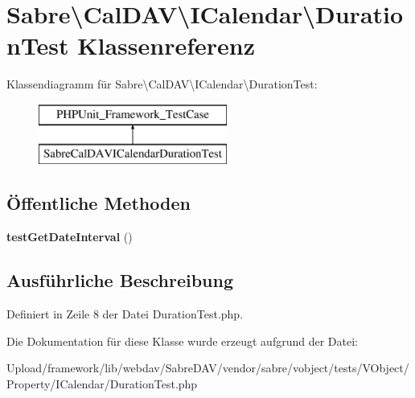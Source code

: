 \hypertarget{class_sabre_1_1_v_object_1_1_property_1_1_i_calendar_1_1_duration_test}{}\section{Sabre\textbackslash{}Cal\+D\+AV\textbackslash{}I\+Calendar\textbackslash{}Duration\+Test Klassenreferenz}
\label{class_sabre_1_1_v_object_1_1_property_1_1_i_calendar_1_1_duration_test}
Klassendiagramm für Sabre\textbackslash{}Cal\+D\+AV\textbackslash{}I\+Calendar\textbackslash{}Duration\+Test\+:\begin{figure}[H]
\begin{center}
\leavevmode
\includegraphics[height=2.000000cm]{class_sabre_1_1_v_object_1_1_property_1_1_i_calendar_1_1_duration_test}
\end{center}
\end{figure}
\subsection*{Öffentliche Methoden}
\begin{DoxyCompactItemize}
\item 
\mbox{\label{class_sabre_1_1_v_object_1_1_property_1_1_i_calendar_1_1_duration_test_acf41b5c42eb5c0b84f90b423f3fc8b4c}} 
{\bfseries test\+Get\+Date\+Interval} ()
\end{DoxyCompactItemize}


\subsection{Ausführliche Beschreibung}


Definiert in Zeile 8 der Datei Duration\+Test.\+php.



Die Dokumentation für diese Klasse wurde erzeugt aufgrund der Datei\+:\begin{DoxyCompactItemize}
\item 
Upload/framework/lib/webdav/\+Sabre\+D\+A\+V/vendor/sabre/vobject/tests/\+V\+Object/\+Property/\+I\+Calendar/Duration\+Test.\+php\end{DoxyCompactItemize}
